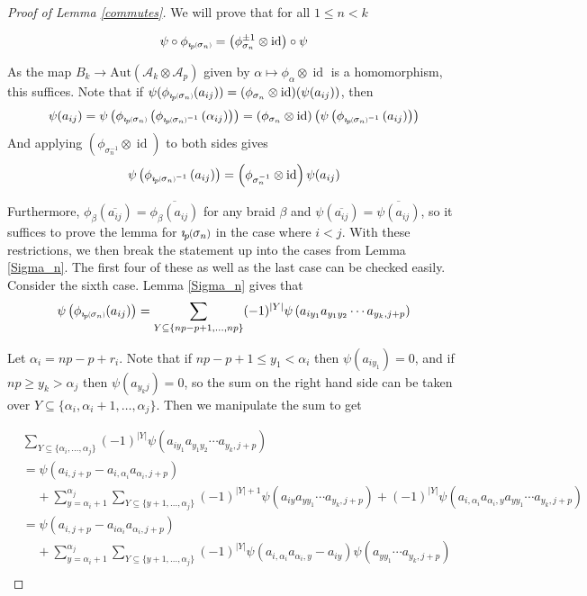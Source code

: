 \documentclass[11pt]{amsart}
\def\A{{\mathcal A}}
\def\s{{\sigma}}
\def\a{\alpha}
\newcommand*{\smallp}[1]{\scalebox{.75}{\ensuremath#1}}
\newcommand*{\subsmallp}[1]{\scalebox{.5}{\ensuremath#1}}
\newcommand{\pp}[2][p]{\imath_{\hspace*{-1pt}#1}\hspace*{-.5pt}\smallp(#2\smallp)}
\newcommand{\subpp}[2][p]{\imath_{\hspace*{-1pt}#1}\hspace*{-.5pt}\subsmallp(#2\subsmallp)}
\newcommand\id{\operatorname{id}}
\theoremstyle{definition}
\begin{document}
\begin{proof} [Proof of Lemma \ref{commutes}]
We will prove that for all $1\le n < k$

$$\psi\circ\phi_{\subpp{\s_n}} = \left(\phi^{\pm 1}_{\s_n}\otimes \id\right)\circ\psi$$

As the map $B_{k} \to \text{Aut}(\A_k\otimes\A_p)$ given by $\alpha \mapsto \phi_\alpha\otimes\id$ is a homomorphism, this suffices.  Note that if $\psi(\phi_{\subpp{\s_n}}(a_{ij})) = (\phi_{\s_n} \otimes \id)(\psi(a_{ij}))$, then
$$\psi(a_{ij}) = \psi\left(\phi_{\subpp{\s_n}}\left(\phi_{\subpp{\s_n}^{-1}}\left(\a_{ij}\right)\right)\right) =  \left(\phi_{\s_n}\otimes\id\right)\left(\psi\left(\phi_{\subpp{\s_n}^{-1}}\left(a_{ij}\right)\right)\right) $$
And applying $\left(\phi_{\s_n^{-1}}\otimes\id\right)$ to both sides gives
$$\psi\left(\phi_{\subpp{\s_n}^{-1}}\left(a_{ij}\right)\right) = \left(\phi_{\s_n^{-1}}\otimes\id\right)\psi(a_{ij})$$

Furthermore, $\phi_\beta(\overline{a_{ij}}) = \overline{\phi_\beta(a_{ij})}$ for any braid $\beta$ and $\psi(\overline{a_{ij}}) = \overline{\psi(a_{ij})}$, so it suffices to prove the lemma for $\pp{\s_n}$ in the case where $i<j$.  With these restrictions, we then break the statement up into the cases from Lemma \ref{Sigma_n}.  The first four of these as well as the last case can be checked easily.  Consider the sixth case.  Lemma \ref{Sigma_n} gives that
$$\psi\left(\phi_{\subpp{\s_n}}(a_{ij})\right) = \sum_{Y\subseteq \{np-p+1,\ldots,np\}}(-1)^{|Y|}\psi\left(a_{iy_1}a_{y_1y_2}\cdots a_{y_k,j+p}\right)$$


Let $\a_i  = np-p+r_i$.  Note that if $np-p+1\le y_1<\a_i$ then $\psi(a_{iy_1}) = 0$, and if $np \ge y_k>\a_j$ then $\psi(a_{y_kj}) = 0$, so the sum on the right hand side can be taken over $Y\subseteq\{\a_i,\a_i+1,\ldots,\a_j\}$.  Then we manipulate the sum to get

\begin{align*}
& \sum_{Y\subseteq \{\a_i,\ldots,\a_j\}}(-1)^{|Y|}\psi\left(a_{iy_1}a_{y_1y_2}\cdots a_{y_k,j+p}\right)\\
&= \psi\left(a_{i,j+p} - a_{i,\a_i}a_{\a_i,j+p}\right)\\
& \;\;\;\;+ \sum_{y=\a_i+1}^{\a_j}\sum_{Y\subseteq \{y+1,\ldots,\a_j\}}(-1)^{|Y|+1}\psi\left(a_{iy}a_{yy_1}\cdots a_{y_k,j+p}\right) + (-1)^{|Y|}\psi\left(a_{i,\a_i}a_{\a_i,y}a_{yy_1}\cdots a_{y_k,j+p}\right)\\
&= \psi\left(a_{i,j+p} - a_{i\a_i}a_{\a_i,j+p}\right)\\
& \;\;\;\;+ \sum_{y=\a_i+1}^{\a_j}\sum_{Y\subseteq \{y+1,\ldots,\a_j\}}(-1)^{|Y|}\psi\left(a_{i,\a_i}a_{\a_i,y} - a_{iy}\right)\psi\left(a_{yy_1}\cdots a_{y_k,j+p}\right)\\
\end{align*}




\end{proof}
\end{document}
